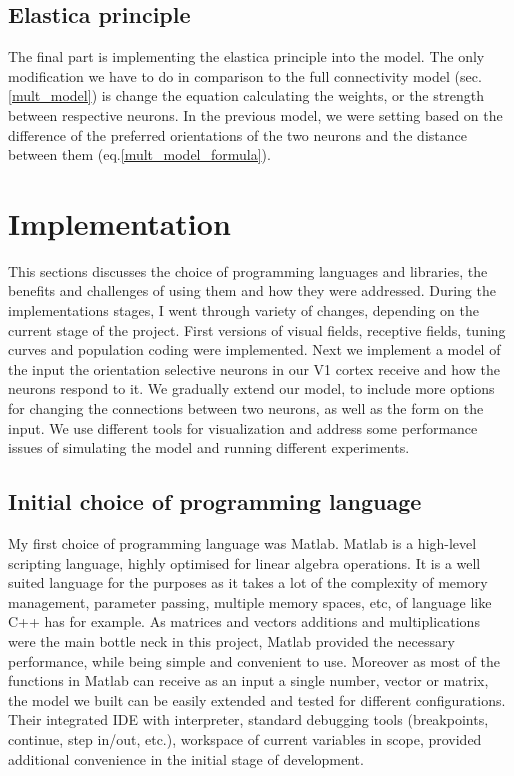 
\section{Elastica principle}

The final part is implementing the elastica principle into the model. The only modification we have to do in comparison to the full connectivity model (sec.\ref{mult_model}) is change the equation calculating the weights, or the strength between respective neurons. In the previous model, we were setting based on the difference of the preferred orientations of the two neurons and the distance between them (eq.\ref{mult_model_formula}).






\chapter{Implementation}

This sections discusses the choice of programming languages and libraries, the benefits and challenges of using them and how they were addressed. During the implementations stages, I went through variety of changes, depending on the current stage of the project. First versions of visual fields, receptive fields, tuning curves and population coding were implemented. Next we implement a model of the input the orientation selective neurons in our V1 cortex receive and how the neurons respond to it. We gradually extend our model, to include more options for changing the connections between two neurons, as well as the form on the input. We use different tools for visualization and address some performance issues of simulating the model and running different experiments.


\section{Initial choice of programming language}
My first choice of programming language was Matlab. Matlab is a high-level scripting language, highly optimised for linear algebra operations. It is a well suited language for the purposes as it takes a lot of the complexity of memory management, parameter passing, multiple memory spaces, etc, of language like C++ has for example. As matrices and vectors additions and multiplications were the main bottle neck in this project, Matlab provided the necessary performance, while being simple and convenient to use. Moreover as most of the functions in Matlab can receive as an input a single number, vector or matrix, the model we built can be easily extended and tested for different configurations. Their integrated IDE with interpreter, standard debugging tools (breakpoints, continue, step in/out, etc.), workspace of current variables in scope, provided additional convenience in the initial stage of development.


